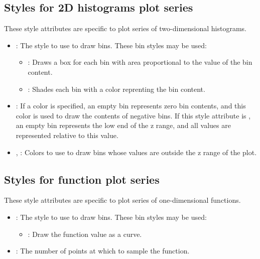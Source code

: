 \subsection{Styles for 2D histograms plot series}

These style attributes are specific to plot series of two-dimensional
histograms.

\begin{itemize}
 \item {}: The style to use to draw bins.  These bin styles
 may be used:
 \begin{itemize}
  \item {}: Draws a box for each bin with area proportional to
  the value of the bin content.

  \item {}: Shades each bin with a color reprenting the
  bin content.
 \end{itemize}

 \item {}: If a color is specified, an empty bin
 represents zero bin contents, and this color is used to draw the
 contents of negative bins.  If this style attribute is , an
 empty bin represents the low end of the z range, and all values are
 represented relative to this value.

 \item {}, : Colors to use to
 draw bins whose values are outside the z range of the plot.
\end{itemize}


\subsection{Styles for function plot series}

These style attributes are specific to plot series of one-dimensional
functions.  

\begin{itemize}
 \item {}: The style to use to draw bins.  These bin styles
 may be used:
 \begin{itemize}
  \item {}: Draw the function value as a curve.
 \end{itemize}

 \item {}: The number of points at which to
 sample the function.

\end{itemize}

